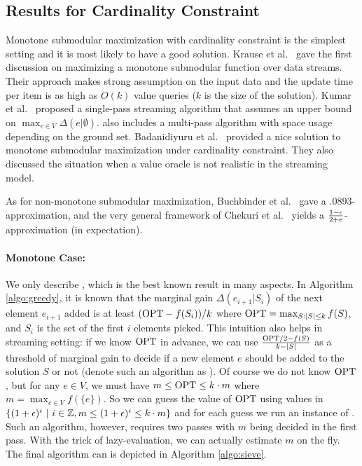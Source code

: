 \subsection{Results for  Cardinality Constraint}
Monotone submodular maximization with cardinality constraint is the simplest setting and it is most likely to have a good solution. Krause et al.\ \cite{KG10} gave the first discussion on maximizing a monotone submodular function over data streams. Their approach makes strong assumption on the input data and the update time per item is as high as $O(k)$ value queries ($k$ is the size of the solution).  Kumar et al.\ \cite{KMV+15} proposed a single-pass streaming algorithm that assumes an upper bound on $\max_{e\in V}\Delta(e|\emptyset)$. \cite{KMV+15} also includes a multi-pass algorithm with space usage depending on the ground set. Badanidiyuru et al.\ \cite{BMK+14} provided a nice solution to monotone submodular maximization under cardinality constraint. They also discussed the situation when a value oracle is not realistic in the streaming model. 

As for non-monotone submodular maximization, Buchbinder et al.\ \cite{BFS15} gave a $.0893$-approximation, and the very general framework of Chekuri et al.\ \cite{CGQ15} yields a $\frac{1-\epsilon}{2 + e}$-approximation (in expectation). 


\paragraph{Monotone Case:} We only describe \cite{BMK+14}, which is the best known result in many aspects.  In Algorithm \ref{algo:greedy}, it is known that the marginal gain $\Delta(e_{i+1}|S_i)$ of the next element $e_{i+1}$ added is at least $(\text{OPT} - f(S_i))/k$ where $\text{OPT}=\max_{S:|S|\leq k} f(S)$, and $S_i$ is the set of the first $i$ elements picked. This intuition also helps in streaming setting: if we know $\text{OPT}$ in advance, we can use $\frac{\text{OPT}/2 - f(S)}{k - |S|}$ as a  threshold of marginal gain to decide if a new element $e$ should be added to the solution $S$ or not (denote such an algorithm as \knowopt). Of course we do not know $\text{OPT}$, but for any $e\in V$, we must have $m \leq \text{OPT} \leq k\cdot m$ where $m = \max_{e\in V}f(\{e\})$. So we can guess the value of $\text{OPT}$ using values in $\{(1 + \epsilon)^i~|~i\in\mathbb{Z}, m\leq (1 + \epsilon)^i \leq k\cdot m\}$ and for each guess we run an instance of \knowopt. Such an algorithm, however, requires two passes with $m$ being decided in the first pass. With the trick of lazy-evaluation, we can actually estimate $m$ on the fly. The final algorithm can is depicted in Algorithm \ref{algo:sieve}.

